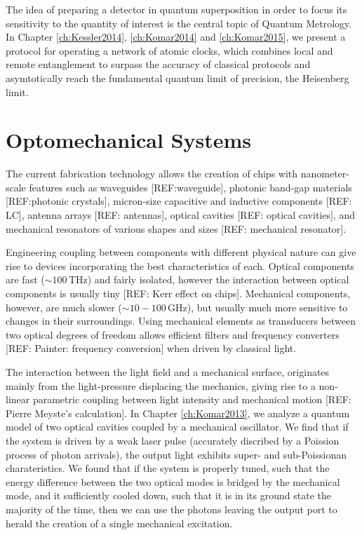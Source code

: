 The idea of preparing a detector in quantum
superposition in order to focus its sensitivity to the quantity of interest is
the central topic of Quantum Metrology. In Chapter \ref{ch:Kessler2014},
\ref{ch:Komar2014} and \ref{ch:Komar2015}, we present a
protocol for operating a network of atomic clocks, which combines local and
remote entanglement to surpass the accuracy of classical protocols and asymtotically
reach the fundamental quantum limit of precision, the Heisenberg limit. 


 
 
 
 
 
 
\section{Optomechanical Systems}
The current fabrication technology allows the creation of chips with
nanometer-scale features such as waveguides [REF:waveguide], photonic band-gap
materials [REF:photonic crystals], micron-size capacitive and inductive
components [REF: LC], antenna arrays [REF: antennas], optical cavities [REF:
optical cavities], and mechanical resonators of various shapes and sizes [REF:
mechanical resonator]. 

Engineering coupling between components with different physical nature can give
rise to devices incorporating the best characteristics of each. Optical
components are fast ($\sim 100\,\mathrm{THz}$) and fairly isolated, however the
interaction between optical components is usually tiny [REF: Kerr effect on
chips]. Mechanical components, however, are much slower ($\sim
10-100\,\mathrm{GHz}$), but usually much more sensitive to changes in their
surroundings. Using mechanical elements as transducers between two optical
degrees of freedom allows efficient filters and frequency converters [REF:
Painter: frequency conversion] when driven by classical light.

The interaction between the light field and a mechanical surface, originates
mainly from the light-pressure displacing the mechanics, giving rise to a
non-linear parametric coupling between light intensity and mechanical motion
[REF: Pierre Meyste's calculation]. In Chapter \ref{ch:Komar2013}, we
analyze a quantum model of two optical cavities coupled by a mechanical
oscillator. We find that if the system is driven by a weak laser pulse
(accurately discribed by a Poission process of photon arrivals), the output
light exhibits super- and sub-Poissionan charateristics. We found that if the
system is properly tuned, such that the energy difference between
the two optical modes is bridged by the mechanical mode, and it sufficiently
cooled down, such that it is in its ground state the majority of the time,
then we can use the photons leaving the output port to herald the creation of a
single mechanical excitation.

